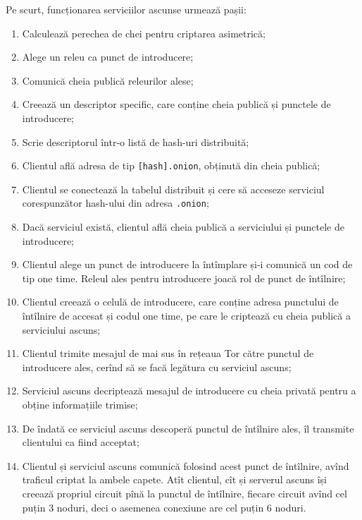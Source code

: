 Pe scurt, funcționarea serviciilor ascunse urmează pașii:
\begin{enumerate}[(1)]
  \item Calculează perechea de chei pentru criptarea asimetrică;
  \item Alege un releu ca punct de introducere;
  \item Comunică cheia publică releurilor alese;
  \item Creează un descriptor specific, care conține cheia publică și 
    punctele de introducere;
  \item Scrie descriptorul într-o listă de hash-uri distribuită;
  \item Clientul află adresa de tip \texttt{[hash].onion}, obținută din
    cheia publică;
  \item Clientul se conectează la tabelul distribuit și cere să acceseze
    serviciul corespunzător hash-ului din adresa \texttt{.onion};
  \item Dacă serviciul există, clientul află cheia publică a serviciului
    și punctele de introducere;
  \item Clientul alege un punct de introducere la întîmplare și-i comunică
    un cod de tip one time. Releul ales pentru introducere joacă rol de 
    punct de întîlnire;
  \item Clientul creează o celulă de introducere, care conține adresa
    punctului de întîlnire de accesat și codul one time, pe care le criptează
    cu cheia publică a serviciului ascuns;
  \item Clientul trimite mesajul de mai sus în rețeaua Tor către punctul de
    introducere ales, cerînd să se facă legătura cu serviciul ascuns;
  \item Serviciul ascuns decriptează mesajul de introducere cu cheia privată
    pentru a obține informațiile trimise;
   \item De îndată ce serviciul ascuns descoperă punctul de întîlnire ales,
     îl transmite clientului ca fiind acceptat;
   \item Clientul și serviciul ascuns comunică folosind acest punct de întîlnire,
     avînd traficul criptat la ambele capete. Atît clientul, cît și serverul ascuns
     își creează propriul circuit pînă la punctul de întîlnire, fiecare circuit
     avînd cel puțin 3 noduri, deci o asemenea conexiune are cel puțin 6 noduri.
\end{enumerate}
